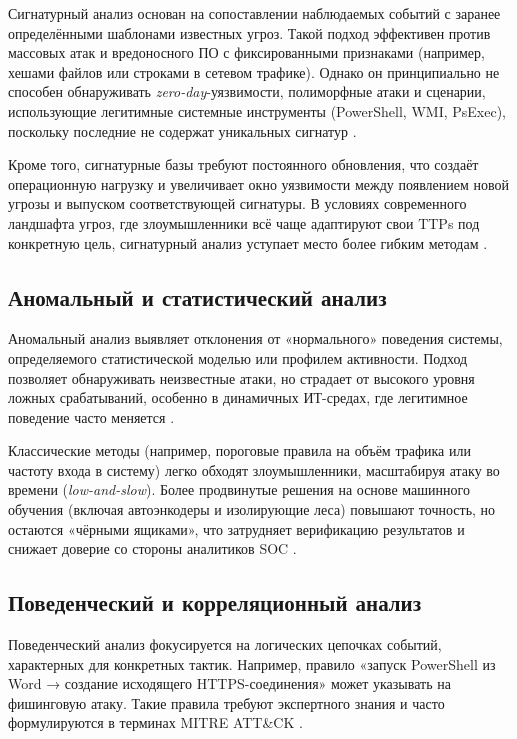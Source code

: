 \documentclass{article}
\begin{document}
Сигнатурный анализ основан на сопоставлении наблюдаемых событий с заранее определёнными шаблонами известных угроз. Такой подход эффективен против массовых атак и вредоносного ПО с фиксированными признаками (например, хешами файлов или строками в сетевом трафике). Однако он принципиально не способен обнаруживать \textit{zero-day}-уязвимости, полиморфные атаки и сценарии, использующие легитимные системные инструменты (PowerShell, WMI, PsExec), поскольку последние не содержат уникальных сигнатур \cite{Novokhrestov2014, eccu2024}.

Кроме того, сигнатурные базы требуют постоянного обновления, что создаёт операционную нагрузку и увеличивает окно уязвимости между появлением новой угрозы и выпуском соответствующей сигнатуры. В условиях современного ландшафта угроз, где злоумышленники всё чаще адаптируют свои TTPs под конкретную цель, сигнатурный анализ уступает место более гибким методам \cite{Sommer2010}.

\subsection{Аномальный и статистический анализ}

Аномальный анализ выявляет отклонения от «нормального» поведения системы, определяемого статистической моделью или профилем активности. Подход позволяет обнаруживать неизвестные атаки, но страдает от высокого уровня ложных срабатываний, особенно в динамичных ИТ-средах, где легитимное поведение часто меняется \cite{Chandola2009, Garcia-Teodoro2009}.

Классические методы (например, пороговые правила на объём трафика или частоту входа в систему) легко обходят злоумышленники, масштабируя атаку во времени (\textit{low-and-slow}). Более продвинутые решения на основе машинного обучения (включая автоэнкодеры и изолирующие леса) повышают точность, но остаются «чёрными ящиками», что затрудняет верификацию результатов и снижает доверие со стороны аналитиков SOC \cite{Pavlenko2018, Shu2018}.

\subsection{Поведенческий и корреляционный анализ}

Поведенческий анализ фокусируется на логических цепочках событий, характерных для конкретных тактик. Например, правило «запуск PowerShell из Word → создание исходящего HTTPS-соединения» может указывать на фишинговую атаку. Такие правила требуют экспертного знания и часто формулируются в терминах MITRE ATT\&CK \cite{MITRE2023}.
\end{document}
